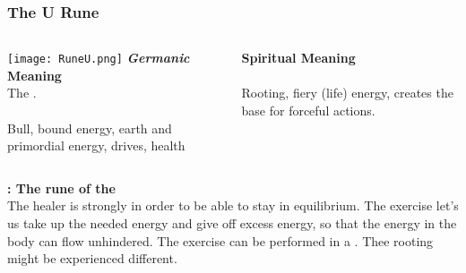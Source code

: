 

\begin{frame}
\frametitle{The U Rune}
\begin{columns}[c] %

\texttt{[image: RuneU.png]}
\textbf{\textit{Germanic} Meaning}\\
The . \\
\\
Bull, bound energy, earth and primordial energy, drives, health

\textbf{Spiritual Meaning}\\
\\

Rooting, fiery (life) energy, creates the base for forceful actions.
\end{columns}

\vspace{5mm}
\textbf{: The rune of the }\\
The healer is strongly  in order to be able to stay in equilibrium. The exercise let's us take up the needed energy and give off excess energy, so that the energy in the body  can flow unhindered. 
The exercise can be performed in a . Thee rooting might be experienced different.
\end{frame}
